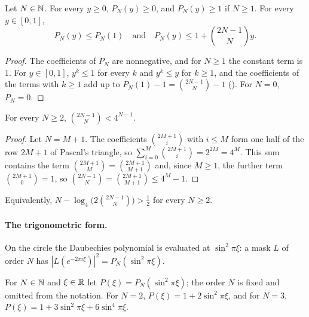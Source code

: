 \begin{lemma}
\label{lem:daub-poly-bounds}
\leanok
{}
Let $N \in \mathbb{N}$. For every $y \geq 0$, $P_N(y) \geq 0$, and $P_N(y) \geq 1$ if $N \geq 1$. For
every $y \in [0, 1]$,
\[
  P_N(y) \leq P_N(1) \quad\text{and}\quad P_N(y) \leq 1 + \binom{2N-1}{N} y .
\]
\end{lemma}

\begin{proof}
\leanok
{}
The coefficients of $P_N$ are nonnegative, and for $N \geq 1$ the constant term is $1$. For
$y \in [0, 1]$, $y^k \leq 1$ for every $k$ and $y^k \leq y$ for $k \geq 1$, and the coefficients
of the terms with $k \geq 1$ add up to $P_N(1) - 1 = \binom{2N-1}{N} - 1$
(). For $N = 0$, $P_N = 0$.
\end{proof}

\begin{lemma}
\label{lem:daub-choose-bound}
\leanok
For every $N \geq 2$, $\binom{2N-1}{N} < 4^{N-1}$.
\end{lemma}

\begin{proof}
\leanok
Let $N = M + 1$. The coefficients $\binom{2M+1}{i}$ with $i \leq M$ form one half of the row
$2M + 1$ of Pascal's triangle, so $\sum_{i=0}^{M} \binom{2M+1}{i} = 2^{2M} = 4^M$. This sum
contains the term $\binom{2M+1}{M} = \binom{2M+1}{M+1}$ and, since $M \geq 1$, the further term
$\binom{2M+1}{0} = 1$, so $\binom{2N-1}{N} = \binom{2M+1}{M+1} \leq 4^M - 1$.
\end{proof}

Equivalently, $N - \log_4 \bigl(2 \binom{2N-1}{N}\bigr) > \frac12$ for every $N \geq 2$.

\paragraph{The trigonometric form.}
On the circle the Daubechies polynomial is evaluated at $\sin^2 \pi\xi$: a mask $L$ of order $N$
has $|L(e^{-2\pi i \xi})|^2 = P_N(\sin^2 \pi\xi)$.

\begin{definition}
\label{def:daub-fun}
\leanok
{}
For $N \in \mathbb{N}$ and $\xi \in \mathbb{R}$ let $P(\xi) = P_N(\sin^2 \pi\xi)$; the order $N$ is fixed and
omitted from the notation. For $N = 2$, $P(\xi) = 1 + 2 \sin^2 \pi\xi$, and for $N = 3$,
$P(\xi) = 1 + 3 \sin^2 \pi\xi + 6 \sin^4 \pi\xi$.
\end{definition}

